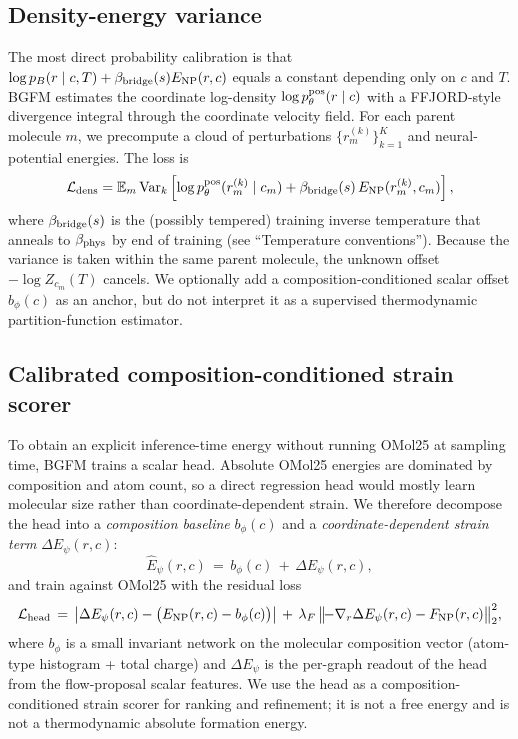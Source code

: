 \documentclass{article}
\begin{document}
\subsection{Density-energy variance}

The most direct probability calibration is that
$\log p_B(r\mid c,T)+\beta_{\rm bridge}(s) E_{\rm NP}(r,c)$ equals a
constant depending only on $c$ and $T$. BGFM estimates the coordinate
log-density $\log p_\theta^{\rm pos}(r\mid c)$ with a FFJORD-style
divergence integral through the coordinate velocity field. For each
parent molecule $m$, we precompute a cloud of perturbations
$\{r_m^{(k)}\}_{k=1}^K$ and neural-potential energies. The loss is
\begin{equation}
    \mathcal L_{\rm dens}=\mathbb E_m\operatorname{Var}_{k}
    \left[
        \log p_\theta^{\rm pos}(r_m^{(k)}\mid c_m)
        +\beta_{\rm bridge}(s)\, E_{\rm NP}(r_m^{(k)},c_m)
    \right],
    \label{eq:density-energy}
\end{equation}
where $\beta_{\rm bridge}(s)$ is the (possibly tempered) training
inverse temperature that anneals to $\beta_{\rm phys}$ by end of
training (see ``Temperature conventions'').
Because the variance is taken within the same parent molecule, the
unknown offset $-\log Z_{c_m}(T)$ cancels. We optionally add a
composition-conditioned scalar offset $b_\phi(c)$ as an anchor, but do
not interpret it as a supervised thermodynamic partition-function
estimator.

\subsection{Calibrated composition-conditioned strain scorer}
\label{sec:method:head}

To obtain an explicit inference-time energy without running OMol25 at
sampling time, BGFM trains a scalar head. Absolute OMol25 energies are
dominated by composition and atom count, so a direct regression head
would mostly learn molecular size rather than coordinate-dependent
strain. We therefore decompose the head into a
\emph{composition baseline} $b_\phi(c)$ and a
\emph{coordinate-dependent strain term} $\Delta E_\psi(r, c)$:
\begin{equation}
    \hat E_\psi(r, c) \,=\, b_\phi(c) \,+\, \Delta E_\psi(r, c),
    \label{eq:head-decomp}
\end{equation}
and train against OMol25 with the residual loss
\begin{equation}
    \mathcal L_{\rm head}
    \,=\, \bigl| \Delta E_\psi(r, c) - \bigl(E_{\rm NP}(r, c) - b_\phi(c)\bigr) \bigr|
    \,+\, \lambda_F\,\bigl\|\!-\nabla_r \Delta E_\psi(r, c) - F_{\rm NP}(r, c)\bigr\|_2^2,
    \label{eq:head-loss}
\end{equation}
where $b_\phi$ is a small invariant network on the molecular
composition vector (atom-type histogram + total charge) and
$\Delta E_\psi$ is the per-graph readout of the head from the
flow-proposal scalar features. We use the head as a
composition-conditioned strain scorer for ranking and refinement; it is
not a free energy and is not a thermodynamic absolute formation energy.
\end{document}
